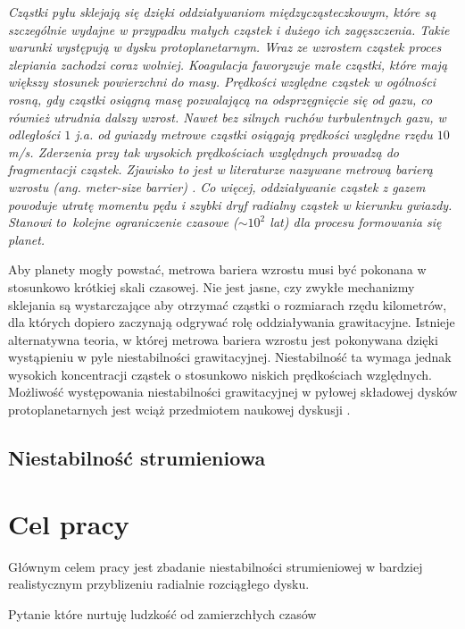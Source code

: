{\it
Cząstki pyłu sklejają się dzięki oddziaływaniom międzycząsteczkowym, które są
szczególnie wydajne w przypadku małych cząstek i dużego ich zagęszczenia. Takie
warunki występują w dysku protoplanetarnym. Wraz ze wzrostem cząstek proces
zlepiania zachodzi coraz wolniej. Koagulacja faworyzuje małe cząstki, które mają
większy stosunek powierzchni do masy. Prędkości względne cząstek w ogólności
rosną, gdy cząstki osiągną masę pozwalającą na odsprzęgnięcie się od gazu, co
również utrudnia dalszy wzrost. Nawet bez silnych ruchów turbulentnych gazu, w
odległości $1$ j.a. od gwiazdy metrowe cząstki osiągają prędkości względne rzędu
$10$ m/s. Zderzenia przy tak wysokich prędkościach względnych prowadzą do
fragmentacji cząstek. Zjawisko to jest w literaturze nazywane metrową barierą
wzrostu (ang. {\it meter-size barrier}) \cite{ormel}. Co więcej, oddziaływanie
cząstek z gazem powoduje utratę momentu pędu i szybki dryf radialny cząstek w
kierunku gwiazdy. Stanowi to~kolejne ograniczenie czasowe ($\sim 10^2$ lat) dla
procesu formowania się planet.

Aby planety mogły powstać, metrowa bariera wzrostu musi być pokonana w
stosunkowo krótkiej skali czasowej. Nie jest jasne, czy zwykłe mechanizmy
sklejania są wystarczające aby otrzymać cząstki o rozmiarach rzędu kilometrów,
dla których dopiero zaczynają odgrywać rolę oddziaływania grawitacyjne. Istnieje
alternatywna teoria, w której metrowa bariera wzrostu jest pokonywana dzięki
wystąpieniu w pyle niestabilności grawitacyjnej. Niestabilność ta wymaga jednak
wysokich koncentracji cząstek o stosunkowo niskich prędkościach względnych.
Możliwość występowania niestabilności grawitacyjnej w pyłowej składowej dysków
protoplanetarnych jest wciąż przedmiotem naukowej dyskusji \cite{gi1,gi2}.
}
\subsection{Niestabilność strumieniowa}
\section{Cel pracy}
Głównym celem pracy jest zbadanie niestabilności strumieniowej w bardziej
realistycznym przyblizeniu radialnie rozciągłego dysku.

 Pytanie które nurtuję ludzkość od
zamierzchłych czasów 

